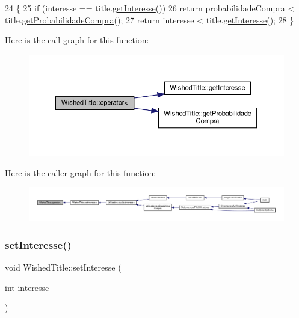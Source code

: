 \begin{DoxyCode}
24                                                           \{
25     \textcolor{keywordflow}{if} (interesse == title.\hyperlink{classWishedTitle_af436ada1ae78a4ffc8031863c0f21859}{getInteresse}())
26         \textcolor{keywordflow}{return} probabilidadeCompra < title.\hyperlink{classWishedTitle_a9076a3f48cb0bbd435908c392e5041a9}{getProbabilidadeCompra}();
27     \textcolor{keywordflow}{return} interesse < title.\hyperlink{classWishedTitle_af436ada1ae78a4ffc8031863c0f21859}{getInteresse}();
28 \}
\end{DoxyCode}
Here is the call graph for this function\+:
\nopagebreak
\begin{figure}[H]
\begin{center}
\leavevmode
\includegraphics[width=350pt]{classWishedTitle_a3acf82b03096f649740573441e1cb343_cgraph}
\end{center}
\end{figure}
Here is the caller graph for this function\+:
\nopagebreak
\begin{figure}[H]
\begin{center}
\leavevmode
\includegraphics[width=350pt]{classWishedTitle_a3acf82b03096f649740573441e1cb343_icgraph}
\end{center}
\end{figure}
\mbox{\label{classWishedTitle_ae81814e2837a03f1bcbc1064da0e652e}} 
\subsubsection{\texorpdfstring{set\+Interesse()}{setInteresse()}}
{\footnotesize\ttfamily void Wished\+Title\+::set\+Interesse (\begin{DoxyParamCaption}\item[{int}]{interesse }\end{DoxyParamCaption})\hspace{0.3cm}{\ttfamily [inline]}}


